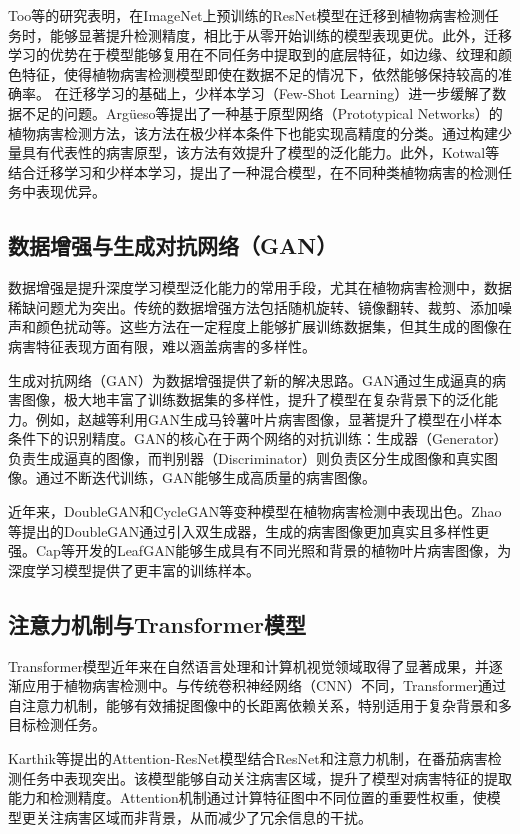 Too等\cite{6}的研究表明，在ImageNet上预训练的ResNet模型在迁移到植物病害检测任务时，能够显著提升检测精度，相比于从零开始训练的模型表现更优。此外，迁移学习的优势在于模型能够复用在不同任务中提取到的底层特征，如边缘、纹理和颜色特征，使得植物病害检测模型即使在数据不足的情况下，依然能够保持较高的准确率。
在迁移学习的基础上，少样本学习（Few-Shot Learning）进一步缓解了数据不足的问题。Argüeso等\cite{10}提出了一种基于原型网络（Prototypical Networks）的植物病害检测方法，该方法在极少样本条件下也能实现高精度的分类。通过构建少量具有代表性的病害原型，该方法有效提升了模型的泛化能力。此外，Kotwal等\cite{18}结合迁移学习和少样本学习，提出了一种混合模型，在不同种类植物病害的检测任务中表现优异。

\subsection{数据增强与生成对抗网络（GAN）}
数据增强是提升深度学习模型泛化能力的常用手段，尤其在植物病害检测中，数据稀缺问题尤为突出。传统的数据增强方法包括随机旋转、镜像翻转、裁剪、添加噪声和颜色扰动等。这些方法在一定程度上能够扩展训练数据集，但其生成的图像在病害特征表现方面有限，难以涵盖病害的多样性。

生成对抗网络（GAN）为数据增强提供了新的解决思路。GAN通过生成逼真的病害图像，极大地丰富了训练数据集的多样性，提升了模型在复杂背景下的泛化能力。例如，赵越等\cite{1}利用GAN生成马铃薯叶片病害图像，显著提升了模型在小样本条件下的识别精度。GAN的核心在于两个网络的对抗训练：生成器（Generator）负责生成逼真的图像，而判别器（Discriminator）则负责区分生成图像和真实图像。通过不断迭代训练，GAN能够生成高质量的病害图像。

近年来，DoubleGAN和CycleGAN等变种模型在植物病害检测中表现出色。Zhao等\cite{21}提出的DoubleGAN通过引入双生成器，生成的病害图像更加真实且多样性更强。Cap等开发的LeafGAN能够生成具有不同光照和背景的植物叶片病害图像，为深度学习模型提供了更丰富的训练样本\cite{23}。

\subsection{注意力机制与Transformer模型}
Transformer模型近年来在自然语言处理和计算机视觉领域取得了显著成果，并逐渐应用于植物病害检测中。与传统卷积神经网络（CNN）不同，Transformer通过自注意力机制，能够有效捕捉图像中的长距离依赖关系，特别适用于复杂背景和多目标检测任务。

Karthik等\cite{11}提出的Attention-ResNet模型结合ResNet和注意力机制，在番茄病害检测任务中表现突出。该模型能够自动关注病害区域，提升了模型对病害特征的提取能力和检测精度。Attention机制通过计算特征图中不同位置的重要性权重，使模型更关注病害区域而非背景，从而减少了冗余信息的干扰。

